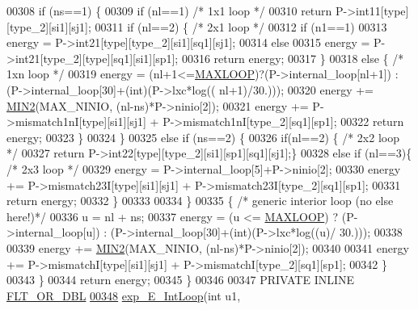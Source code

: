 \begin{DoxyCode}
00308     \textcolor{keywordflow}{if} (ns==1) \{
00309       \textcolor{keywordflow}{if} (nl==1)                    \textcolor{comment}{/* 1x1 loop */}
00310         \textcolor{keywordflow}{return} P->int11[type][type\_2][si1][sj1];
00311       \textcolor{keywordflow}{if} (nl==2) \{                  \textcolor{comment}{/* 2x1 loop */}
00312         \textcolor{keywordflow}{if} (n1==1)
00313           energy = P->int21[type][type\_2][si1][sq1][sj1];
00314         \textcolor{keywordflow}{else}
00315           energy = P->int21[type\_2][type][sq1][si1][sp1];
00316         \textcolor{keywordflow}{return} energy;
00317       \}
00318       \textcolor{keywordflow}{else} \{  \textcolor{comment}{/* 1xn loop */}
00319         energy = (nl+1<=\hyperlink{energy__const_8h_ad1bd6eabac419670ddd3c9ed82145988}{MAXLOOP})?(P->internal\_loop[nl+1]) : (P->internal\_loop[30]+(int)(P->lxc*log((
      nl+1)/30.)));
00320         energy += \hyperlink{group__utils_gae0b9cd0ce090bd69b951aa73e8fa4f7d}{MIN2}(MAX\_NINIO, (nl-ns)*P->ninio[2]);
00321         energy += P->mismatch1nI[type][si1][sj1] + P->mismatch1nI[type\_2][sq1][sp1];
00322         \textcolor{keywordflow}{return} energy;
00323       \}
00324     \}
00325     \textcolor{keywordflow}{else} \textcolor{keywordflow}{if} (ns==2) \{
00326       \textcolor{keywordflow}{if}(nl==2)      \{              \textcolor{comment}{/* 2x2 loop */}
00327         \textcolor{keywordflow}{return} P->int22[type][type\_2][si1][sp1][sq1][sj1];\}
00328       \textcolor{keywordflow}{else} \textcolor{keywordflow}{if} (nl==3)\{              \textcolor{comment}{/* 2x3 loop */}
00329         energy = P->internal\_loop[5]+P->ninio[2];
00330         energy += P->mismatch23I[type][si1][sj1] + P->mismatch23I[type\_2][sq1][sp1];
00331         \textcolor{keywordflow}{return} energy;
00332       \}
00333 
00334     \}
00335     \{ \textcolor{comment}{/* generic interior loop (no else here!)*/}
00336       u = nl + ns;
00337       energy = (u <= \hyperlink{energy__const_8h_ad1bd6eabac419670ddd3c9ed82145988}{MAXLOOP}) ? (P->internal\_loop[u]) : (P->internal\_loop[30]+(int)(P->lxc*log((u)/
      30.)));
00338 
00339       energy += \hyperlink{group__utils_gae0b9cd0ce090bd69b951aa73e8fa4f7d}{MIN2}(MAX\_NINIO, (nl-ns)*P->ninio[2]);
00340 
00341       energy += P->mismatchI[type][si1][sj1] + P->mismatchI[type\_2][sq1][sp1];
00342     \}
00343   \}
00344   \textcolor{keywordflow}{return} energy;
00345 \}
00346 
00347 PRIVATE INLINE \hyperlink{group__data__structures_ga31125aeace516926bf7f251f759b6126}{FLT\_OR\_DBL}
\hypertarget{interior__loops_8h_source_l00348}{}\hyperlink{group__loops_ga34e8abb9e1b54fab38524fb20214a43e}{00348} \hyperlink{group__loops_ga34e8abb9e1b54fab38524fb20214a43e}{exp\_E\_IntLoop}(\textcolor{keywordtype}{int} u1,

\end{DoxyCode}
